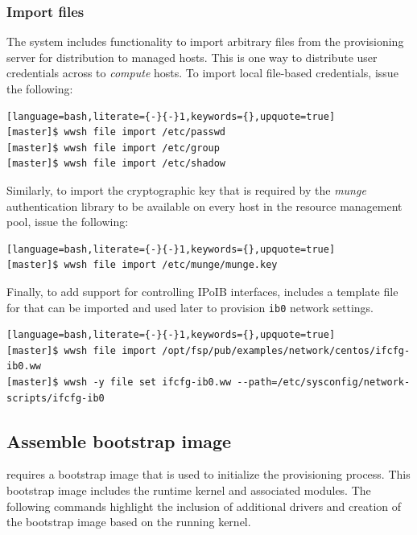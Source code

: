 \documentclass[letterpaper]{article}
\begin{document}
\subsubsection{Import files} \label{sec:file_import}

The \Warewulf{} system includes functionality to import arbitrary files from the
provisioning server for distribution to managed hosts. This is one way
to distribute user credentials across to {\em compute} hosts. To
import local file-based credentials, issue the following:

\begin{lstlisting}[language=bash,literate={-}{-}1,keywords={},upquote=true]
[master]$ wwsh file import /etc/passwd                                                                                                       
[master]$ wwsh file import /etc/group
[master]$ wwsh file import /etc/shadow 
\end{lstlisting}

Similarly, to import the cryptographic key that is required by the {\em munge}
authentication library to be available on every host in the resource management
pool, issue the following:

\begin{lstlisting}[language=bash,literate={-}{-}1,keywords={},upquote=true]
[master]$ wwsh file import /etc/munge/munge.key
\end{lstlisting}

Finally, to add support for controlling IPoIB interfaces, \FSP{} includes a
template file for \Warewulf{} that can be imported and used later to provision
\texttt{ib0} network settings.

\begin{lstlisting}[language=bash,literate={-}{-}1,keywords={},upquote=true]
[master]$ wwsh file import /opt/fsp/pub/examples/network/centos/ifcfg-ib0.ww
[master]$ wwsh -y file set ifcfg-ib0.ww --path=/etc/sysconfig/network-scripts/ifcfg-ib0
\end{lstlisting}

\subsection{Assemble bootstrap image} \label{sec:assemble_bootstrap}

\Warewulf{} requires a bootstrap image that is used to initialize the provisioning
process. This bootstrap image includes the runtime kernel and associated
modules. The following commands highlight the inclusion of additional drivers
and creation of the bootstrap image based on the running kernel.
\end{document}
